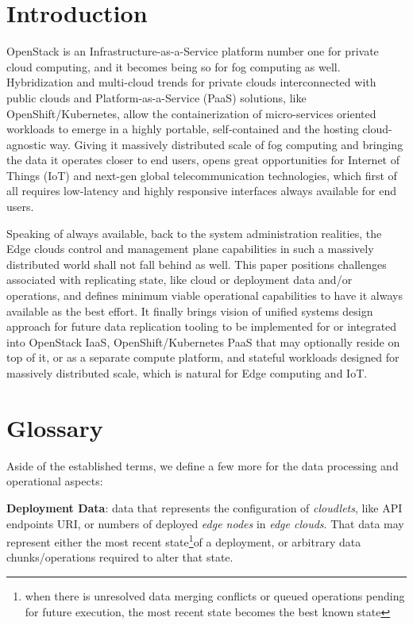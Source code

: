 \documentclass[conference]{IEEEtran}
\begin{document}
\section{Introduction}

OpenStack is an Infrastructure-as-a-Service platform number one for private
cloud computing, and it becomes being so for fog computing as well.
Hybridization and multi-cloud trends for private clouds interconnected with
public clouds and Platform-as-a-Service (PaaS) solutions, like
OpenShift/Kubernetes, allow the containerization of micro-services oriented
workloads to emerge in a highly portable, self-contained and the hosting
cloud-agnostic way. Giving it massively distributed scale of fog computing and
bringing the data it operates closer to end users, opens great opportunities
for Internet of Things (IoT) and next-gen global telecommunication technologies,
which first of all requires low-latency and highly responsive interfaces always
available for end users.

Speaking of always available, back to the system administration realities, the
Edge clouds control and management plane capabilities in such a massively
distributed world shall not fall behind as well. This paper positions
challenges associated with replicating state, like cloud or deployment data
and/or operations, and defines minimum viable operational capabilities to have
it always available as the best effort. It finally brings vision of unified
systems design approach for future data replication tooling to be implemented
for or integrated into OpenStack IaaS, OpenShift/Kubernetes PaaS that may
optionally reside on top of it, or as a separate compute platform, and stateful
workloads designed for massively distributed scale, which is natural for Edge
computing and IoT.

\section{Glossary}

Aside of the established terms\cite{b3}, we define a few more for the data
processing and operational aspects:

\textbf{Deployment Data}: data that represents the configuration of
\textit{cloudlets}\cite{b3}, like API endpoints URI, or numbers of deployed
\textit{edge nodes}\cite{b3} in \textit{edge clouds}\cite{b3}. That data may
represent either the most recent state\footnote{when there is unresolved data
merging conflicts or queued operations pending for future execution, the most
recent state becomes the best known state}of a deployment, or arbitrary data
chunks/operations required to alter that state.
\end{document}
